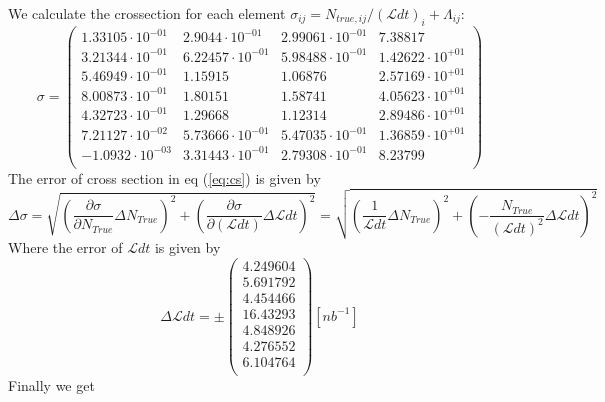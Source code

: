 \documentclass[]{article}
\begin{document}
We calculate the crossection for each element $\sigma_{ij} = N_{true,ij}/(\mathcal{L}dt)_i+\Lambda_{ij}$:
\begin{equation}
\sigma = \begin{pmatrix}
   1.33105\cdot 10^{-01} & 2.9044\cdot 10^{-01} & 2.99061\cdot 10^{-01} & 7.38817 \\
   3.21344\cdot 10^{-01} & 6.22457\cdot 10^{-01} & 5.98488\cdot 10^{-01} & 1.42622\cdot 10^{+01} \\
   5.46949\cdot 10^{-01} & 1.15915 & 1.06876 & 2.57169\cdot 10^{+01} \\
   8.00873\cdot 10^{-01} & 1.80151 & 1.58741 & 4.05623\cdot 10^{+01} \\
   4.32723\cdot 10^{-01} & 1.29668 & 1.12314 & 2.89486\cdot 10^{+01} \\
   7.21127\cdot 10^{-02} & 5.73666\cdot 10^{-01} & 5.47035\cdot 10^{-01} & 1.36859\cdot 10^{+01} \\
   -1.0932\cdot 10^{-03} & 3.31443\cdot 10^{-01} & 2.79308\cdot 10^{-01} & 8.23799 \\
\end{pmatrix}
\end{equation}
The error of cross section in eq (\ref{eq:cs}) is given by
\begin{equation}
\Delta\sigma = \sqrt{\left(\frac{\partial\sigma}{\partial N_{True}}\Delta N_{True}\right)^2+
\left(\frac{\partial\sigma}{\partial (\mathcal{L}dt)}\Delta{\mathcal{L}dt}\right)^2} = \sqrt{\left(\frac{1}{\mathcal{L}dt}\Delta N_{True}\right)^2
+\left(-\frac{N_{True}}{(\mathcal{L}dt)^2}\Delta\mathcal{L}dt\right)^2}
\end{equation}
Where the error of $\mathcal{L}dt$ is given by
\begin{equation}
\Delta\mathcal{L}dt = \pm \begin{pmatrix}
   4.249604 \\
   5.691792 \\
   4.454466 \\
   16.43293 \\
   4.848926 \\
   4.276552 \\
   6.104764 \\
\end{pmatrix} [nb^{-1}]
\end{equation}
Finally we get
\end{document}
